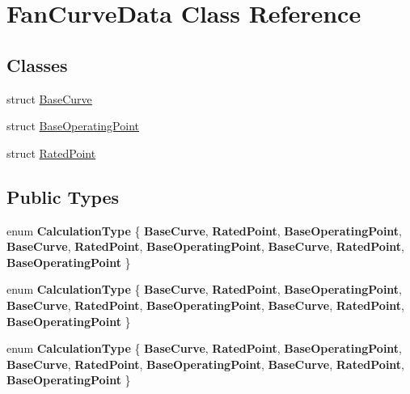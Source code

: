 \hypertarget{class_fan_curve_data}{}\section{Fan\+Curve\+Data Class Reference}
\label{class_fan_curve_data}
\subsection*{Classes}
\begin{DoxyCompactItemize}
\item 
struct \hyperlink{struct_fan_curve_data_1_1_base_curve}{Base\+Curve}
\item 
struct \hyperlink{struct_fan_curve_data_1_1_base_operating_point}{Base\+Operating\+Point}
\item 
struct \hyperlink{struct_fan_curve_data_1_1_rated_point}{Rated\+Point}
\end{DoxyCompactItemize}
\subsection*{Public Types}
\begin{DoxyCompactItemize}
\item 
\mbox{\label{class_fan_curve_data_af87fafad0a2a00e26ba82fb33b1a7282}} 
enum {\bfseries Calculation\+Type} \{ \newline
{\bfseries Base\+Curve}, 
{\bfseries Rated\+Point}, 
{\bfseries Base\+Operating\+Point}, 
{\bfseries Base\+Curve}, 
\newline
{\bfseries Rated\+Point}, 
{\bfseries Base\+Operating\+Point}, 
{\bfseries Base\+Curve}, 
{\bfseries Rated\+Point}, 
\newline
{\bfseries Base\+Operating\+Point}
 \}
\item 
\mbox{\label{class_fan_curve_data_af87fafad0a2a00e26ba82fb33b1a7282}} 
enum {\bfseries Calculation\+Type} \{ \newline
{\bfseries Base\+Curve}, 
{\bfseries Rated\+Point}, 
{\bfseries Base\+Operating\+Point}, 
{\bfseries Base\+Curve}, 
\newline
{\bfseries Rated\+Point}, 
{\bfseries Base\+Operating\+Point}, 
{\bfseries Base\+Curve}, 
{\bfseries Rated\+Point}, 
\newline
{\bfseries Base\+Operating\+Point}
 \}
\item 
\mbox{\label{class_fan_curve_data_af87fafad0a2a00e26ba82fb33b1a7282}} 
enum {\bfseries Calculation\+Type} \{ \newline
{\bfseries Base\+Curve}, 
{\bfseries Rated\+Point}, 
{\bfseries Base\+Operating\+Point}, 
{\bfseries Base\+Curve}, 
\newline
{\bfseries Rated\+Point}, 
{\bfseries Base\+Operating\+Point}, 
{\bfseries Base\+Curve}, 
{\bfseries Rated\+Point}, 
\newline
{\bfseries Base\+Operating\+Point}
 \}
\end{DoxyCompactItemize}
